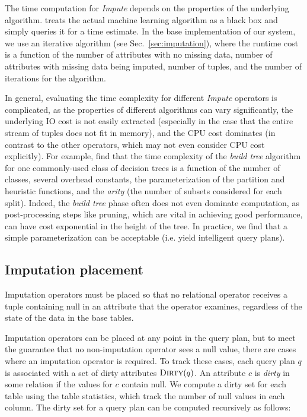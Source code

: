 The time computation for \textit{Impute} depends on the properties of the underlying
algorithm. \ProjectName{} treats the actual machine learning algorithm as a black box
and simply queries it for a time estimate. In the base implementation of our system,
we use an iterative algorithm (see Sec.~\ref{sec:imputation}), where the runtime cost
is a function of the number of attributes with no missing data, number of attributes with
missing data being imputed, number of tuples, and the number of iterations for the algorithm.

In general, evaluating the time complexity for different \textit{Impute} operators is
complicated, as the properties of
different algorithms can vary significantly, the underlying IO cost
is not easily extracted (especially in the case that the entire stream of tuples does not
fit in memory), and the CPU cost dominates (in contrast to the other operators, which may
not even consider CPU cost explicitly). For example, \cite{martin1995time} find that the
time complexity of the \textit{build tree} algorithm for one commonly-used class of
decision trees is a function of the number of classes, several overhead constants, the
parameterization of the partition and heuristic functions, and the \textit{arity} (the
number of subsets considered for each split). Indeed, the \textit{build tree} phase often
does not even dominate computation, as post-processing steps like pruning, which are vital
in achieving good performance, can have cost exponential in the height of the tree. In
practice, we find that a simple parameterization can be acceptable (i.e. yield intelligent query
plans).


\subsection{Imputation placement}
\label{sec:placement}
Imputation operators must be placed so that no relational operator receives a tuple containing null in an attribute that the operator examines, regardless of the state of the data in the base tables.

Imputation operators can be placed at any point in the query plan, but to meet the guarantee that no non-imputation operator sees a null value, there are cases where an imputation operator is required. To track these cases, each query plan $q$ is associated with a set of dirty attributes $\textsc{Dirty}(q)$. An attribute $c$ is \emph{dirty} in some relation if the values for $c$ contain null. We compute a dirty set for each table using the table statistics, which track the number of null values in each column. The dirty set for a query plan can be computed recursively as follows:


